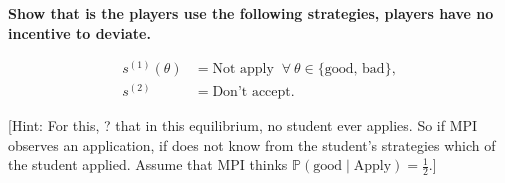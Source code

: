 \documentclass[10pt]{article}
\begin{document}
\textbf{Show that is the players use the following strategies, players have no incentive to
deviate.}

\begin{align*}
    s^{(1)}(\theta) & = \text{Not apply } \ \forall \ \theta \in \{\text{good, bad}\}, \\
    s^{(2)} & = \text{Don't accept}.
\end{align*}

[Hint: For this, ? that in this equilibrium, no student ever applies. So if MPI
observes an application, if does not know from the student's strategies which
of the student applied. Assume that MPI thinks
\(\mathbb{P}(\text{good} \mid \text{Apply}) = \frac{1}{2}\).]
\end{document}
